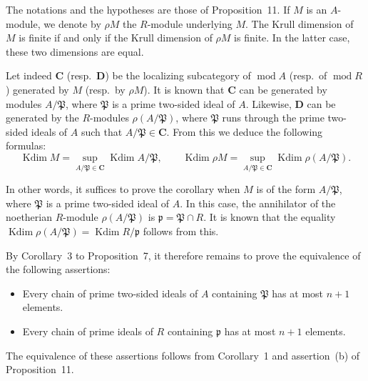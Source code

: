 \begin{corollary}
The notations and the hypotheses are those of Proposition~11. If $M$
is an $A$-module, we denote by $\rho M$ the $R$-module underlying $M$.
The Krull dimension of $M$ is finite if and only if the Krull
dimension of $\rho M$ is finite. In the latter case, these two
dimensions are equal.
\end{corollary}

Let indeed $\mathbf{C}$ (resp.~$\mathbf{D}$) be the localizing
subcategory of $\operatorname{mod}A$ (resp.~of
$\operatorname{mod}R$) generated by $M$ (resp.~by $\rho M$). It is
known that $\mathbf{C}$ can be generated by modules $A/\mathfrak{P}$,
where $\mathfrak{P}$ is a prime two-sided ideal of $A$. Likewise,
$\mathbf{D}$ can be generated by the $R$-modules
$\rho(A/\mathfrak{P})$, where $\mathfrak{P}$ runs through the prime
two-sided ideals of $A$ such that
$A/\mathfrak{P}\in\mathbf{C}$. From this we deduce the following
formulas:
\[
\operatorname{Kdim}M=
\sup_{A/\mathfrak{P}\in\mathbf{C}}\operatorname{Kdim}A/\mathfrak{P},
\qquad
\operatorname{Kdim}\rho M=
\sup_{A/\mathfrak{P}\in\mathbf{C}}
\operatorname{Kdim}\rho(A/\mathfrak{P}).
\]

In other words, it suffices to prove the corollary when $M$ is of the
form $A/\mathfrak{P}$, where $\mathfrak{P}$ is a prime two-sided ideal
of $A$. In this case, the annihilator of the noetherian $R$-module
$\rho(A/\mathfrak{P})$ is $\mathfrak{p}=\mathfrak{P}\cap R$. It is
known that the equality
$\operatorname{Kdim}\rho(A/\mathfrak{P})=
\operatorname{Kdim}R/\mathfrak{p}$ follows from this.

By Corollary~3 to Proposition~7, it therefore remains to prove the
equivalence of the following assertions:
\begin{itemize}
\item Every chain of prime two-sided ideals of $A$ containing
  $\mathfrak{P}$ has at most $n+1$ elements.
\item Every chain of prime ideals of $R$ containing $\mathfrak{p}$ has
  at most $n+1$ elements.
\end{itemize}

The equivalence of these assertions follows from Corollary~1 and
assertion~(b) of Proposition~11.

